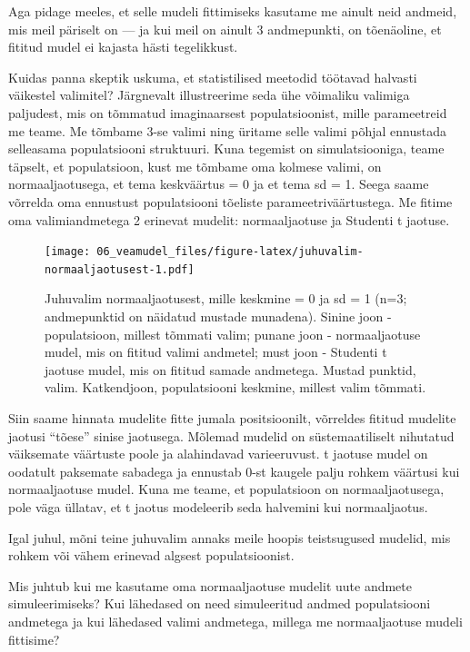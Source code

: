 \documentclass[]{book}
\begin{document}
Aga pidage meeles, et selle mudeli fittimiseks kasutame me ainult neid
andmeid, mis meil päriselt on --- ja kui meil on ainult 3 andmepunkti,
on tõenäoline, et fititud mudel ei kajasta hästi tegelikkust.

Kuidas panna skeptik uskuma, et statistilised meetodid töötavad halvasti
väikestel valimitel? Järgnevalt illustreerime seda ühe võimaliku
valimiga paljudest, mis on tõmmatud imaginaarsest populatsioonist, mille
parameetreid me teame. Me tõmbame 3-se valimi ning üritame selle valimi
põhjal ennustada selleasama populatsiooni struktuuri. Kuna tegemist on
simulatsiooniga, teame täpselt, et populatsioon, kust me tõmbame oma
kolmese valimi, on normaaljaotusega, et tema keskväärtus = 0 ja et tema
sd = 1. Seega saame võrrelda oma ennustust populatsiooni tõeliste
parameetriväärtustega. Me fitime oma valimiandmetega 2 erinevat mudelit:
normaaljaotuse ja Studenti t jaotuse.









\begin{figure}
\centering
\texttt{[image: 06\_veamudel\_files/figure-latex/juhuvalim-normaaljaotusest-1.pdf]}
\caption{\label{fig:juhuvalim-normaaljaotusest}Juhuvalim normaaljaotusest, mille
keskmine = 0 ja sd = 1 (n=3; andmepunktid on näidatud mustade munadena).
Sinine joon - populatsioon, millest tõmmati valim; punane joon -
normaaljaotuse mudel, mis on fititud valimi andmetel; must joon -
Studenti t jaotuse mudel, mis on fititud samade andmetega. Mustad
punktid, valim. Katkendjoon, populatsiooni keskmine, millest valim
tõmmati.}
\end{figure}

Siin saame hinnata mudelite fitte jumala positsioonilt, võrreldes
fititud mudelite jaotusi ``tõese'' sinise jaotusega. Mõlemad mudelid on
süstemaatiliselt nihutatud väiksemate väärtuste poole ja alahindavad
varieeruvust. t jaotuse mudel on oodatult paksemate sabadega ja ennustab
0-st kaugele palju rohkem väärtusi kui normaaljaotuse mudel. Kuna me
teame, et populatsioon on normaaljaotusega, pole väga üllatav, et t
jaotus modeleerib seda halvemini kui normaaljaotus.

Igal juhul, mõni teine juhuvalim annaks meile hoopis teistsugused
mudelid, mis rohkem või vähem erinevad algsest populatsioonist.

Mis juhtub kui me kasutame oma normaaljaotuse mudelit uute andmete
simuleerimiseks? Kui lähedased on need simuleeritud andmed populatsiooni
andmetega ja kui lähedased valimi andmetega, millega me normaaljaotuse
mudeli fittisime?
\end{document}
